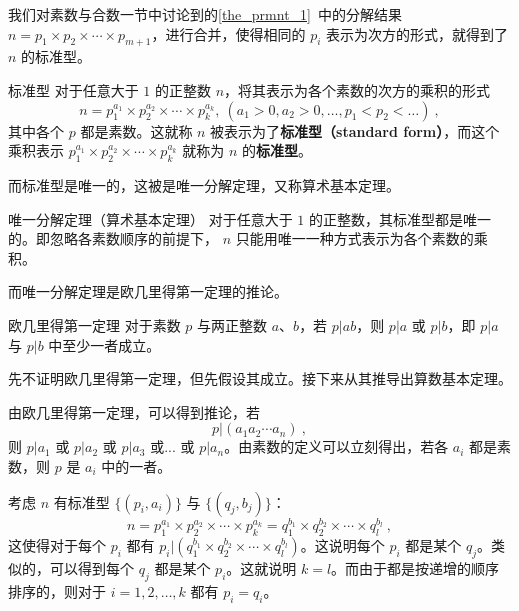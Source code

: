 
我们对素数与合数一节中讨论到的\autoref{the_prmnt_1}~中的分解结果 $n = p_1 \times p_2\times \cdots \times p_{m+1}$，进行合并，使得相同的 $p_i$ 表示为次方的形式，就得到了 $n$ 的标准型。
\begin{definition}{标准型}
对于任意大于 $1$ 的正整数 $n$，将其表示为各个素数的次方的乘积的形式
\begin{equation}
n = p_1^{a_1} \times p_2^{a_2} \times \cdots \times p_k^{a_k}, ~ (a_1 > 0, a_2 > 0 , \dots, p_1 < p_2<\dots) ~,
\end{equation}
其中各个 $p$ 都是素数。这就称 $n$ 被表示为了\textbf{标准型（standard form）}，而这个乘积表示 $p_1^{a_1} \times p_2^{a_2} \times \cdots \times p_k^{a_k}$ 就称为 $n$ 的\textbf{标准型}。
\end{definition}

而标准型是唯一的，这被是唯一分解定理，又称算术基本定理。
\begin{theorem}{唯一分解定理（算术基本定理）}
对于任意大于 $1$ 的正整数，其标准型都是唯一的。即忽略各素数顺序的前提下， $n$ 只能用唯一一种方式表示为各个素数的乘积。
\end{theorem}

而唯一分解定理是欧几里得第一定理的推论。
\begin{theorem}{欧几里得第一定理}
对于素数 $p$ 与两正整数 $a$、$b$，若 $p|ab$，则 $p|a$ 或 $p|b$，即 $p|a$ 与 $p|b$ 中至少一者成立。
\end{theorem}

先不证明欧几里得第一定理，但先假设其成立。接下来从其推导出算数基本定理。

由欧几里得第一定理，可以得到推论，若
\begin{equation}
p | (a_1 a_2 \cdots a_n) ~,
\end{equation}
则 $p | a_1$ 或 $p | a_2$ 或 $p|a_3$ 或... 或 $p|a_n$。由素数的定义可以立刻得出，若各 $a_i$ 都是素数，则 $p$ 是 $a_i$ 中的一者。

考虑 $n$ 有标准型 $\{(p_i, a_i)\}$ 与  $\{(q_j, b_j)\}$：
\begin{equation}
n = p_1^{a_1}\times p_2^{a_2} \times \cdots \times p_k^{a_k} = q_1^{b_1} \times q_2^{b_2} \times \cdots \times q_l^{b_l} ~,
\end{equation}
这使得对于每个 $p_i$ 都有 $p_i | (q_1^{b_1} \times q_2^{b_2} \times \cdots \times q_l^{b_l})$。这说明每个 $p_i$ 都是某个 $q_j$。类似的，可以得到每个 $q_j$ 都是某个 $p_i$。这就说明 $k = l$。而由于都是按递增的顺序排序的，则对于 $i = 1,2,\dots, k$ 都有 $p_i = q_i$。

